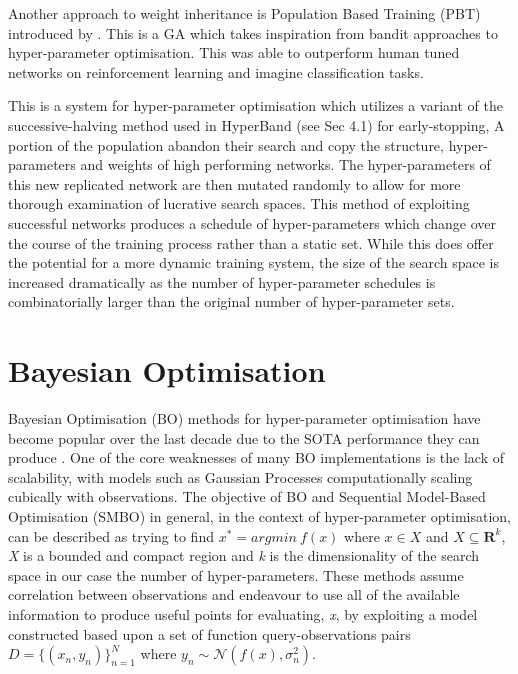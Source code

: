 		Another approach to weight inheritance is Population Based Training (PBT) introduced by \cite{39}. This is a GA which takes inspiration from bandit approaches to hyper-parameter optimisation. This was able to outperform human tuned networks on reinforcement learning and imagine classification tasks.
		\par
		This is a system for hyper-parameter optimisation which utilizes a variant of the  successive-halving\cite{SH} method used in HyperBand (see Sec 4.1) for early-stopping, A portion of the population abandon their search and copy the structure, hyper-parameters and weights of high performing networks. The hyper-parameters of this new replicated network are then mutated randomly to allow for more thorough examination of lucrative search spaces. This method of exploiting successful networks produces a schedule of hyper-parameters which change over the course of the training process rather than a static set. While this does offer the potential for a more dynamic training system, the size of the search space is increased dramatically as the number of hyper-parameter schedules is combinatorially larger than the original number of hyper-parameter sets.


\newpage

\section {Bayesian Optimisation}

	Bayesian Optimisation (BO) methods for hyper-parameter optimisation have become popular over the last decade due to the SOTA performance they can produce \cite{32} \cite{20}. One of the core weaknesses of many BO implementations is the lack of scalability, with models such as Gaussian Processes computationally scaling cubically with observations. The objective of BO and Sequential Model-Based Optimisation (SMBO) in general, in the context of hyper-parameter optimisation, can be described as trying to find \(x^* = argmin~ f(x)\) where \(x \in X\) and \(X \subseteq \mathbf{R} ^k\), \textit{X} is a bounded and compact region and \textit{k} is the dimensionality of the search space in our case the number of hyper-parameters. These methods assume correlation between observations and endeavour to use all of the available information to produce useful points for evaluating, \textit{x}, by exploiting a model constructed based upon a set of function query-observations pairs \( D = \{(x_n,y_n)\}_{n=1}^N\) where \(y_n \sim \mathcal{N}(f(x), \sigma_n^2) \).




